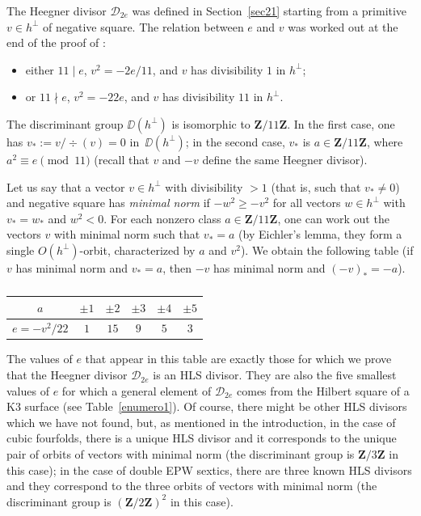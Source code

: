 \documentclass[11pt]{article}
\let\mathcal\mathscr
\theoremstyle{definition}
\newcommand\Z{{\mathbf Z}}
\newcommand\cD{\mathcal{D}}
\begin{document}
The Heegner divisor $\cD_{2e}$ was defined in Section~\ref{sec21} starting from a primitive $v\in h^\bot$ of negative square. The relation between $e$ and $v$ was worked out at the end of the proof of \cite[Prop.\,4.1]{dm}:
\begin{itemize}
\item either $11\mid e$, $v^2=-2e/11$, and $v$ has divisibility $1$ in $ h^\bot$;
\item or $11\nmid e$, $v^2=-22e $, and $v$ has divisibility $11$ in $ h^\bot$.
\end{itemize}
The discriminant group $\DD(h^\bot) $ is isomorphic to $\Z/11\Z$. In the first case, one has $v_*:=v/\div(v)=0$ in~$\DD(h^\bot)$; in the second case, $v_*$ is $a \in \Z/11\Z$, where $a^2\equiv e\pmod{11}$ (recall that $v$ and $-v$ define the same Heegner divisor).

Let us say that a vector $v\in h^\bot$ with divisibility $>1$ (that is, such that $v_*\ne0$) and negative square has \emph{minimal norm} if $-w^2\ge -v^2$ for all vectors $w\in h^\bot$ with $v_*=w_*$ and $w^2<0$. For each nonzero class $a \in \Z/11\Z$, one can work out the vectors $v$ with minimal norm such that $v_*=a$ (by Eichler's lemma, they form a single $O(h^\bot)$-orbit, characterized by $a$ and $v^2$). We obtain the following table (if $v$ has minimal norm and $v_*=a$, then $-v$ has minimal norm and $(-v)_*=-a$).

\begin{table}[htb!]
\renewcommand\arraystretch{1.5}
\begin{tabular}{|c|c|c|c|c|c|}
\hline
$a$&$\pm 1$&$\pm2$&$\pm3$&$\pm4$&$\pm5$
\\
\hline
$e=-v^2/22$&$1$&$15$&$9$&$5$&$3$
\\
\hline
\end{tabular}
\vspace{\baselineskip}
\caption{}\label{enumero2}
\vspace{-\baselineskip}
\end{table}
The values of $e$ that appear in this table are exactly those for which we prove that the Heegner divisor $\cD_{2e}$ is an HLS divisor. They are also the five smallest values of $e$ for which a general element of $\cD_{2e}$ comes from the Hilbert square of a K3 surface (see Table~\ref{enumero1}). Of course, there might be other HLS divisors which we have not found, but, as mentioned in the introduction, in the case of cubic fourfolds, there is a unique HLS divisor and it corresponds to the unique pair of orbits of vectors with minimal norm (the discriminant group is $\Z/3\Z$ in this case); in the case of double EPW sextics, there are three known HLS divisors and they correspond to the three orbits of vectors with minimal norm (the discriminant group is $(\Z/2\Z)^2$ in this case).
\end{document}
